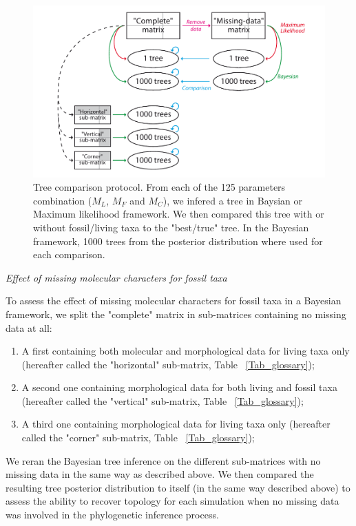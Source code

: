 \documentclass[12pt,letterpaper]{article}
\renewcommand{\subsection}[1]{%
\bigskip
\begin{center}
\begin{large}
\normalfont\itshape #1
\end{large}
\end{center}}
\begin{document}
\begin{figure} %
\centering
\includegraphics[keepaspectratio=true]{Figures/TEM_Fig_TreeCmp.pdf}
\caption{Tree comparison protocol.
From each of the 125 parameters combination ($M_L$, $M_F$ and $M_C$), we infered a tree in Baysian or Maximum likelihood framework.
We then compared this tree with or without fossil/living taxa to the "best/true" tree.
In the Bayesian framework, 1000 trees from the posterior distribution where used for each comparison.}
\label{Fig_Compare}
\end{figure}

\subsection{Effect of missing molecular characters for fossil taxa} %
To assess the effect of missing molecular characters for fossil taxa in a Bayesian framework, we split the "complete" matrix in sub-matrices containing no missing data at all:
\begin{enumerate}
\item
A first containing both molecular and morphological data for living taxa only (hereafter called the "horizontal" sub-matrix, Table ~\ref{Tab_glossary});
\item
A second one containing morphological data for both living and fossil taxa (hereafter called the "vertical" sub-matrix, Table ~\ref{Tab_glossary});
\item
A third one containing morphological data for living taxa only (hereafter called the "corner" sub-matrix, Table ~\ref{Tab_glossary});
\end{enumerate}
We reran the Bayesian tree inference on the different sub-matrices with no missing data in the same way as described above.
We then compared the resulting tree posterior distribution to itself (in the same way described above) to assess the ability to recover topology for each simulation when no missing data was involved in the phylogenetic inference process.
\end{document}
